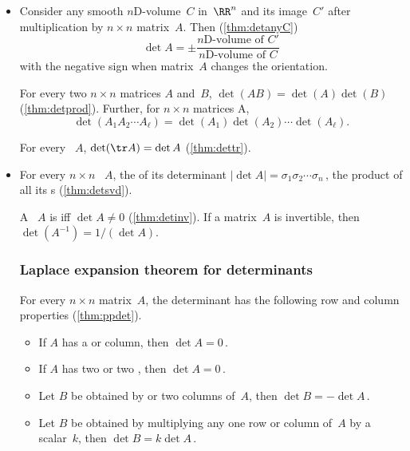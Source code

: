 \begin{itemize}
\item Consider any  smooth $n$D-volume~\(C\) in~\(\RR^n\) and its image~\(C'\) after multiplication by \(n\times n\) matrix~\(A\).
Then (\cref{thm:detanyC})
\begin{equation*}
\det A=\pm\frac{\text{$n$D-volume of }C'}
{\text{$n$D-volume of }C}
\end{equation*}
with the negative sign when matrix~\(A\) changes the orientation.

\itemhi For every two \(n\times n\) matrices \(A\) and~\(B\), \(\det(AB)=\det(A)\det(B)\) (\cref{thm:detprod}).
Further, for \(n\times n\) matrices \hlist A\ell, \begin{equation*}
\det(A_1A_2\cdots A_\ell)=\det(A_1)\det(A_2)\cdots\det(A_\ell).
\end{equation*}


\itemme For every ~\(A\), \(\det(\tr A)=\det A\) (\cref{thm:dettr}).

\item For every \(n\times n\) ~\(A\), the  of its determinant \(|\det A|=\sigma_1\sigma_2\cdots\sigma_n\)\,, the product of all its s (\cref{thm:detsvd}).

\itemme A ~\(A\) is  iff \(\det A\neq 0\) (\cref{thm:detinv}).
If a matrix~\(A\) is invertible, then \(\det(A^{-1})=1/(\det A)\).







\subsubsection*{Laplace expansion theorem for determinants}

\itemhi For every \(n\times n\) matrix~\(A\), the determinant has the following row and column properties (\cref{thm:ppdet}).
\begin{itemize}
\item
If \(A\) has a  or column, then \(\det A=0\)\,.
\item
If \(A\) has two  or two , then  \(\det A=0\)\,.
\item
Let \(B\) be obtained by  or two columns of~\(A\), then \(\det B=-\det A\)\,.
\item
Let \(B\) be obtained by multiplying any one row or column of~\(A\) by a scalar~\(k\), then \(\det B=k\det A\)\,.
\end{itemize}


\end{itemize}
